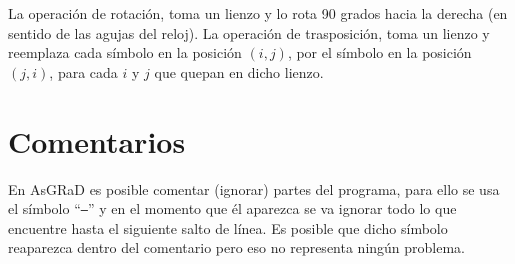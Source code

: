 \documentclass[letterpaper,11pt]{article}
\newcommand{\asgrad}{AsGRaD\xspace}
\newcommand{\qt}[1]{``\texttt{#1}''}
\begin{document}
La operación de rotación, toma un lienzo y lo rota 90 grados hacia la derecha (en sentido de las agujas del reloj). La operación de trasposición, toma un lienzo y reemplaza cada símbolo en la posición $(i, j)$, por el símbolo en la posición $(j, i)$, para cada $i$ y $j$ que quepan en dicho lienzo.

\section{Comentarios}

En \asgrad es posible comentar (ignorar) partes del programa, para ello se usa el símbolo \qt{--} y en el momento que él aparezca se va ignorar todo lo que encuentre hasta el siguiente salto de línea. Es posible que dicho símbolo reaparezca dentro del comentario pero eso no representa ningún problema.
\end{document}
